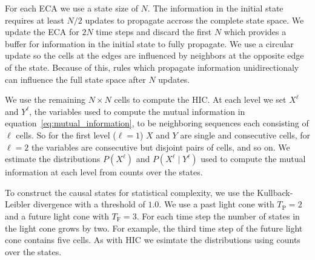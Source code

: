 For each ECA we use a state size of $N$. The information in the initial state
requires at least $N/2$ updates to propagate accross the complete state space.
We update the ECA for $2N$ time steps and discard the first $N$ which provides
a buffer for information in the initial state to fully propagate. We use a
circular update so the cells at the edges are influenced by neighbors at the
opposite edge of the state.  Because of this, rules which propagate information
unidirectionaly can influence the full state space after $N$ updates.

We use the remaining $N \times N$ cells to compute the HIC. At each level we
set $X^\ell$ and $Y^\ell$, the variables used to compute the mutual information
in equation~\ref{eq:mutual_information}, to be neighboring sequences each
consisting of $\ell$ cells. So for the first level ($\ell = 1$) $X$ and $Y$ are
single and consecutive cells, for $\ell = 2$ the variables are consecutive but
disjoint pairs of cells, and so on. We estimate the distributions $P(X^\ell)$
and $P(X^\ell \mid Y^\ell)$ used to compute the mutual information at each
level from counts over the states.

To construct the causal states for statistical complexity, we use the
Kullback-Leibler divergence with a threshold of $1.0$. We use a past light cone
with $T_{\textrm{P}}=2$ and a future light cone with $T_{\textrm{F}} = 3$.  For
each time step the number of states in the light cone grows by two. For
example, the third time step of the future light cone contains five cells. As
with HIC we esimtate the distributions using counts over the states.

